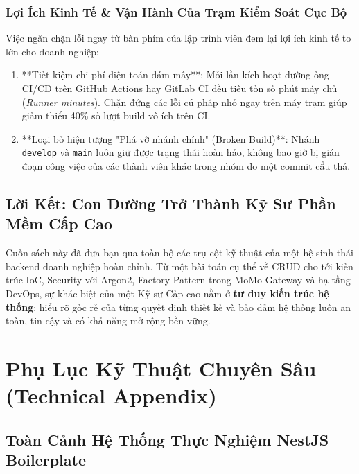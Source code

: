 \documentclass[12pt,a4paper,oneside]{book}
\begin{document}
\section{Lợi Ích Kinh Tế \& Vận Hành Của Trạm Kiểm Soát Cục Bộ}
Việc ngăn chặn lỗi ngay từ bàn phím của lập trình viên đem lại lợi ích kinh tế to lớn cho doanh nghiệp:
\begin{enumerate}
  \item **Tiết kiệm chi phí điện toán đám mây**: Mỗi lần kích hoạt đường ống CI/CD trên GitHub Actions hay GitLab CI đều tiêu tốn số phút máy chủ (\textit{Runner minutes}). Chặn đứng các lỗi cú pháp nhỏ ngay trên máy trạm giúp giảm thiểu 40\% số lượt build vô ích trên CI.
  \item **Loại bỏ hiện tượng "Phá vỡ nhánh chính" (Broken Build)**: Nhánh \texttt{develop} và \texttt{main} luôn giữ được trạng thái hoàn hảo, không bao giờ bị gián đoạn công việc của các thành viên khác trong nhóm do một commit cẩu thả.
\end{enumerate}

\chapter*{Lời Kết: Con Đường Trở Thành Kỹ Sư Phần Mềm Cấp Cao}

Cuốn sách này đã đưa bạn qua toàn bộ các trụ cột kỹ thuật của một hệ sinh thái backend doanh nghiệp hoàn chỉnh. Từ một bài toán cụ thể về CRUD cho tới kiến trúc IoC, Security với Argon2, Factory Pattern trong MoMo Gateway và hạ tầng DevOps, sự khác biệt của một Kỹ sư Cấp cao nằm ở \textbf{tư duy kiến trúc hệ thống}: hiểu rõ gốc rễ của từng quyết định thiết kế và bảo đảm hệ thống luôn an toàn, tin cậy và có khả năng mở rộng bền vững.

\newpage

\appendix
\part{Phụ Lục Kỹ Thuật Chuyên Sâu (Technical Appendix)}

\chapter{Toàn Cảnh Hệ Thống Thực Nghiệm NestJS Boilerplate}
\end{document}
